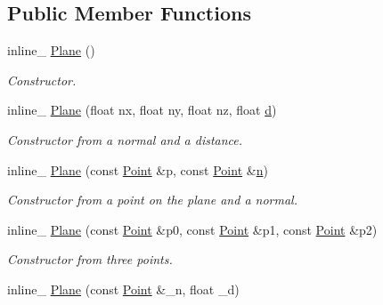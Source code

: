 \subsection*{Public Member Functions}
\begin{DoxyCompactItemize}
\item 
inline\+\_\+ \hyperlink{classOpcode_1_1Plane_a2a69d7c35401fd956f8ae8c0800396f0}{Plane} ()\hypertarget{classOpcode_1_1Plane_a2a69d7c35401fd956f8ae8c0800396f0}{}\label{classOpcode_1_1Plane_a2a69d7c35401fd956f8ae8c0800396f0}

\begin{DoxyCompactList}\small\item\em Constructor. \end{DoxyCompactList}\item 
inline\+\_\+ \hyperlink{classOpcode_1_1Plane_a9f1d5dc5758553a518502f379f19c315}{Plane} (float nx, float ny, float nz, float \hyperlink{classOpcode_1_1Plane_a93a3e9c381229709ef5749fe1c0f5c5b}{d})\hypertarget{classOpcode_1_1Plane_a9f1d5dc5758553a518502f379f19c315}{}\label{classOpcode_1_1Plane_a9f1d5dc5758553a518502f379f19c315}

\begin{DoxyCompactList}\small\item\em Constructor from a normal and a distance. \end{DoxyCompactList}\item 
inline\+\_\+ \hyperlink{classOpcode_1_1Plane_a2e4b2b1fd56017d3b27aa3d321c61028}{Plane} (const \hyperlink{classOpcode_1_1Point}{Point} \&p, const \hyperlink{classOpcode_1_1Point}{Point} \&\hyperlink{classOpcode_1_1Plane_adb0176a77163295160a715367227d68a}{n})\hypertarget{classOpcode_1_1Plane_a2e4b2b1fd56017d3b27aa3d321c61028}{}\label{classOpcode_1_1Plane_a2e4b2b1fd56017d3b27aa3d321c61028}

\begin{DoxyCompactList}\small\item\em Constructor from a point on the plane and a normal. \end{DoxyCompactList}\item 
inline\+\_\+ \hyperlink{classOpcode_1_1Plane_a9fe0f2c9da24df73ef60f671516e8a87}{Plane} (const \hyperlink{classOpcode_1_1Point}{Point} \&p0, const \hyperlink{classOpcode_1_1Point}{Point} \&p1, const \hyperlink{classOpcode_1_1Point}{Point} \&p2)\hypertarget{classOpcode_1_1Plane_a9fe0f2c9da24df73ef60f671516e8a87}{}\label{classOpcode_1_1Plane_a9fe0f2c9da24df73ef60f671516e8a87}

\begin{DoxyCompactList}\small\item\em Constructor from three points. \end{DoxyCompactList}\item 
inline\+\_\+ \hyperlink{classOpcode_1_1Plane_a7013bc776edcc8242b4d219985290165}{Plane} (const \hyperlink{classOpcode_1_1Point}{Point} \&\+\_\+n, float \+\_\+d)\hypertarget{classOpcode_1_1Plane_a7013bc776edcc8242b4d219985290165}{}\label{classOpcode_1_1Plane_a7013bc776edcc8242b4d219985290165}


\end{DoxyCompactItemize}
